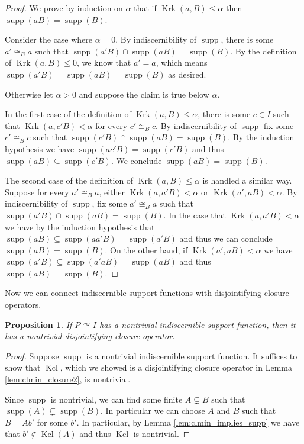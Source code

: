 \documentclass[12pt]{amsart}
\theoremstyle{plain}
\newtheorem{proposition}[theorem]{Proposition}
\theoremstyle{definition}
\newcommand{\isom}{\cong}
\DeclareMathOperator{\supp}{supp}
\DeclareMathOperator{\clmin}{Kcl}
\DeclareMathOperator{\Krk}{Krk}
\begin{document}
\begin{proof}
We prove by induction on $\alpha$ that if $\Krk(a, B) \le \alpha$ then $\supp(aB) = \supp(B)$.

Consider the case where $\alpha = 0$.
By indiscernibility of $\supp$, there is some $a' \isom_B a$ such that $\supp(a'B) \cap \supp(aB) = \supp(B)$.
By the definition of $\Krk(a,B) \le 0$, we know that $a' = a$, which means $\supp(a'B) = \supp(aB) = \supp(B)$ as desired.

Otherwise let $\alpha > 0$ and suppose the claim is true below $\alpha$.

In the first case of the definition of $\Krk(a, B) \le \alpha$, there is some $c \in I$ such that $\Krk(a, c'B) < \alpha$ for every $c' \isom_B c$.
By indiscernibility of $\supp$ fix some $c' \isom_B c$ such that $\supp(c'B) \cap \supp(aB) = \supp(B)$. 
By the induction hypothesis we have $\supp(ac'B) = \supp(c'B)$ and thus $\supp(aB) \subseteq \supp(c'B)$.
We conclude $\supp(aB) = \supp(B)$.

The second case of the definition of $\Krk(a, B) \le \alpha$ is handled a similar way.
Suppose for every $a' \isom_B a$, either $\Krk(a, a'B) < \alpha$ or $\Krk(a', aB) < \alpha$.
By indiscernibility of $\supp$, fix some $a' \isom_B a$ such that $\supp(a'B) \cap \supp(aB) = \supp(B)$.
In the case that $\Krk(a, a'B) < \alpha$ we have by the induction hypothesis that $\supp(aB) \subseteq \supp(aa'B) = \supp(a'B)$ and thus we can conclude $\supp(aB) = \supp(B)$.
On the other hand, if $\Krk(a', aB) < \alpha$ we have $\supp(a'B) \subseteq \supp(a'aB) = \supp(aB)$ and thus $\supp(aB) = \supp(B)$.
\end{proof}

Now we can connect indiscernible support functions with disjointifying closure operators.

\begin{proposition}\label{prop:supp_implies_cl}
If $P \curvearrowright I$ has a nontrivial indiscernible support function, then it has a nontrivial disjointifying closure operator.
\end{proposition}

\begin{proof}
Suppose $\supp$ is a nontrivial indiscernible support function.
It suffices to show that $\clmin$, which we showed is a disjointifying closure operator in Lemma \ref{lem:clmin_closure2}, is nontrivial.

Since $\supp$ is nontrivial, we can find some finite $A \subsetneq B$ such that $\supp(A) \subsetneq \supp(B)$.
In particular we can choose $A$ and $B$ such that $B = Ab'$ for some $b'$.
In particular, by Lemma \ref{lem:clmin_implies_supp} we have that $b' \not\in \clmin(A)$ and thus $\clmin$ is nontrivial.
\end{proof}
\end{document}

